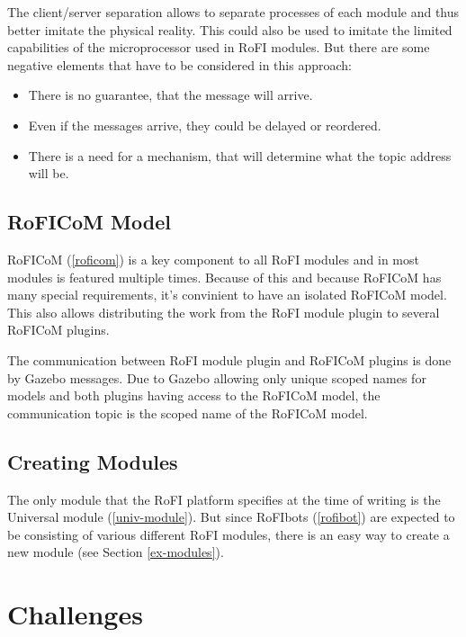 \documentclass[
  digital, %
  table,   %
  oneside, %
  nolof,     %
  nolot,     %
]{fithesis3}
\begin{document}
The client/server separation allows to separate processes of each module and thus better imitate the physical reality.
This could also be used to imitate the limited capabilities of the microprocessor used in RoFI modules.
But there are some negative elements that have to be considered in this approach:
\begin{itemize}
    \item There is no guarantee, that the message will arrive.
    \item Even if the messages arrive, they could be delayed or reordered.
    \item There is a need for a mechanism, that will determine what the topic address will be.
\end{itemize}

\subsection{RoFICoM Model}

RoFICoM (\ref{roficom}) is a key component to all RoFI modules and in most modules is featured multiple times.
Because of this and because RoFICoM has many special requirements, it's convinient to have an isolated RoFICoM model.
This also allows distributing the work from the RoFI module plugin to several RoFICoM plugins.

The communication between RoFI module plugin and RoFICoM plugins is done by Gazebo messages.
Due to Gazebo allowing only unique scoped names for models and both plugins having access to the RoFICoM model, the communication topic is the scoped name of the RoFICoM model.

\subsection{Creating Modules}

The only module that the RoFI platform specifies at the time of writing is the Universal module (\ref{univ-module}).
But since RoFIbots (\ref{rofibot}) are expected to be consisting of various different RoFI modules, there is an easy way to create a new module (see Section \ref{ex-modules}).

\section{Challenges}
\end{document}
